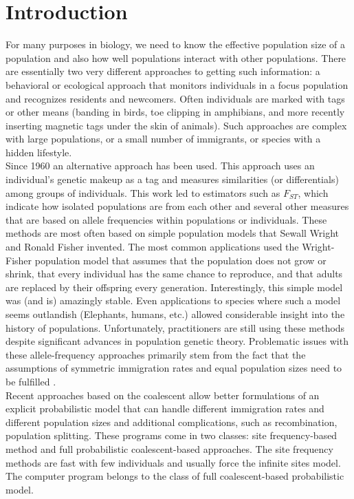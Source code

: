 \chapter{Introduction}

For many purposes in biology, we need to know the effective population size of a population and also how well populations interact with other populations. There are essentially two very different approaches to getting such information: a behavioral or ecological approach that monitors individuals in a focus population and recognizes residents and newcomers. Often individuals are marked with tags or other means (banding in birds, toe clipping in amphibians, and more recently inserting magnetic tags under the skin of animals). Such approaches are complex with large populations, or a small number of immigrants, or species with a hidden lifestyle. \\

Since 1960 an alternative approach has been used. This approach uses an individual's genetic makeup as a tag and measures similarities (or differentials) among groups of individuals. This work led to estimators such as $F_{ST}$, which indicate how isolated populations are from each other and several other measures that are based on allele frequencies within populations or individuals. These methods are most often based on simple population models that Sewall Wright and Ronald Fisher invented. The most common applications used the Wright-Fisher population model that assumes that the population does not grow or shrink, that every individual has the same chance to reproduce, and that adults are replaced by their offspring every generation.
Interestingly, this simple model was (and is) amazingly stable. Even applications to species where such a model seems outlandish (Elephants, humans, etc.) allowed considerable insight into the history of populations. Unfortunately, practitioners are still using these methods despite significant advances in population genetic theory. Problematic issues with these allele-frequency approaches primarily stem from the fact that the assumptions of symmetric immigration rates and equal population sizes need to be fulfilled \citep{beerli:2004:EUP}.\\

Recent approaches based on the coalescent \citep{kingman:2000:oc} allow better formulations of an explicit probabilistic model that can handle different immigration rates and different population sizes and additional complications, such as recombination, population splitting.
These programs come in two classes: site frequency-based method and full probabilistic coalescent-based approaches. The site frequency methods are fast with few individuals and usually force the infinite sites model. The computer program \migrate belongs to the class of full coalescent-based probabilistic model.

